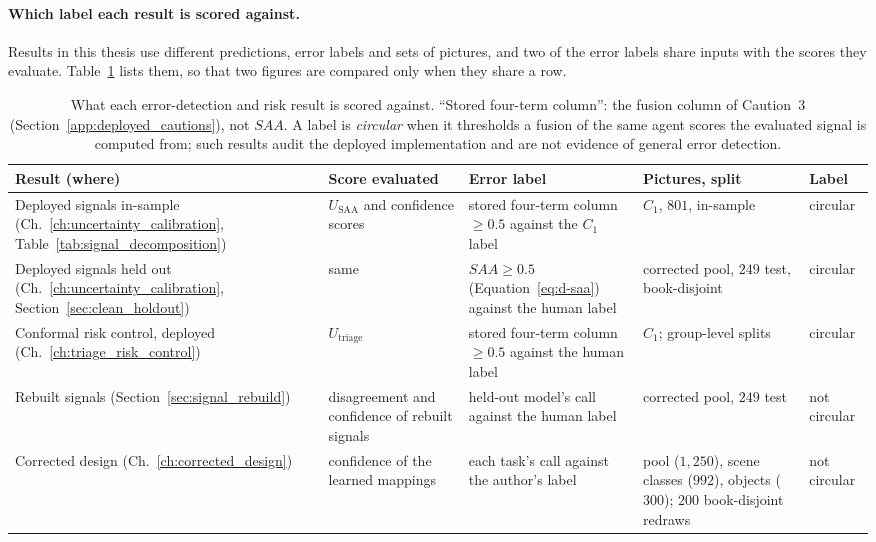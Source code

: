 \documentclass[12pt,a4paper]{report}
\begin{document}
\paragraph{Which label each result is scored against.} Results in this thesis use different predictions, error labels and sets of pictures, and two of the error labels share inputs with the scores they evaluate. Table~\ref{tab:metric_registry} lists them, so that two figures are compared only when they share a row.

\begin{table}[!htbp]
\centering
\caption[What each result is scored against]{What each error-detection and risk result is scored against. ``Stored four-term column'': the fusion column of Caution~3 (Section~\ref{app:deployed_cautions}), not $SAA$. A label is \emph{circular} when it thresholds a fusion of the same agent scores the evaluated signal is computed from; such results audit the deployed implementation and are not evidence of general error detection.}
\label{tab:metric_registry}
\scriptsize
\begin{tabular}{>{\raggedright\arraybackslash}p{2.9cm} >{\raggedright\arraybackslash}p{2.5cm} >{\raggedright\arraybackslash}p{3.6cm} >{\raggedright\arraybackslash}p{2.6cm} >{\raggedright\arraybackslash}p{1.6cm}}
\toprule
\textbf{Result (where)} & \textbf{Score evaluated} & \textbf{Error label} & \textbf{Pictures, split} & \textbf{Label} \\
\midrule
Deployed signals in-sample (Ch.~\ref{ch:uncertainty_calibration}, Table~\ref{tab:signal_decomposition}) & $U_{\text{SAA}}$ and confidence scores & stored four-term column $\ge 0.5$ against the $C_1$ label & $C_1$, $801$, in-sample & circular \\
Deployed signals held out (Ch.~\ref{ch:uncertainty_calibration}, Section~\ref{sec:clean_holdout}) & same & $SAA \ge 0.5$ (Equation~\ref{eq:d-saa}) against the human label & corrected pool, $249$ test, book-disjoint & circular \\
Conformal risk control, deployed (Ch.~\ref{ch:triage_risk_control}) & $U_{\text{triage}}$ & stored four-term column $\ge 0.5$ against the human label & $C_1$; group-level splits & circular \\
Rebuilt signals (Section~\ref{sec:signal_rebuild}) & disagreement and confidence of rebuilt signals & held-out model's call against the human label & corrected pool, $249$ test & not circular \\
Corrected design (Ch.~\ref{ch:corrected_design}) & confidence of the learned mappings & each task's call against the author's label & pool ($1{,}250$), scene classes ($992$), objects ($300$); $200$ book-disjoint redraws & not circular \\

\end{tabular}
\end{table}
\end{document}
